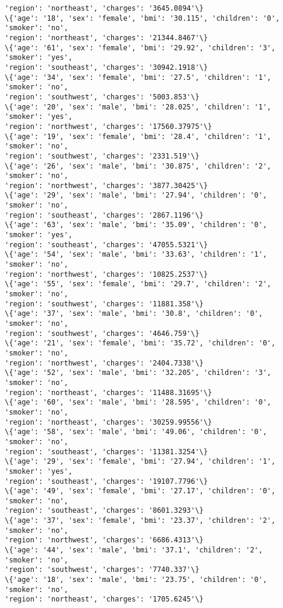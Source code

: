 \documentclass[11pt]{article}
\begin{document}
\begin{Verbatim}[commandchars=\\\{\}]
'region': 'northeast', 'charges': '3645.0894'\}
\{'age': '18', 'sex': 'female', 'bmi': '30.115', 'children': '0', 'smoker': 'no',
'region': 'northeast', 'charges': '21344.8467'\}
\{'age': '61', 'sex': 'female', 'bmi': '29.92', 'children': '3', 'smoker': 'yes',
'region': 'southeast', 'charges': '30942.1918'\}
\{'age': '34', 'sex': 'female', 'bmi': '27.5', 'children': '1', 'smoker': 'no',
'region': 'southwest', 'charges': '5003.853'\}
\{'age': '20', 'sex': 'male', 'bmi': '28.025', 'children': '1', 'smoker': 'yes',
'region': 'northwest', 'charges': '17560.37975'\}
\{'age': '19', 'sex': 'female', 'bmi': '28.4', 'children': '1', 'smoker': 'no',
'region': 'southwest', 'charges': '2331.519'\}
\{'age': '26', 'sex': 'male', 'bmi': '30.875', 'children': '2', 'smoker': 'no',
'region': 'northwest', 'charges': '3877.30425'\}
\{'age': '29', 'sex': 'male', 'bmi': '27.94', 'children': '0', 'smoker': 'no',
'region': 'southeast', 'charges': '2867.1196'\}
\{'age': '63', 'sex': 'male', 'bmi': '35.09', 'children': '0', 'smoker': 'yes',
'region': 'southeast', 'charges': '47055.5321'\}
\{'age': '54', 'sex': 'male', 'bmi': '33.63', 'children': '1', 'smoker': 'no',
'region': 'northwest', 'charges': '10825.2537'\}
\{'age': '55', 'sex': 'female', 'bmi': '29.7', 'children': '2', 'smoker': 'no',
'region': 'southwest', 'charges': '11881.358'\}
\{'age': '37', 'sex': 'male', 'bmi': '30.8', 'children': '0', 'smoker': 'no',
'region': 'southwest', 'charges': '4646.759'\}
\{'age': '21', 'sex': 'female', 'bmi': '35.72', 'children': '0', 'smoker': 'no',
'region': 'northwest', 'charges': '2404.7338'\}
\{'age': '52', 'sex': 'male', 'bmi': '32.205', 'children': '3', 'smoker': 'no',
'region': 'northeast', 'charges': '11488.31695'\}
\{'age': '60', 'sex': 'male', 'bmi': '28.595', 'children': '0', 'smoker': 'no',
'region': 'northeast', 'charges': '30259.99556'\}
\{'age': '58', 'sex': 'male', 'bmi': '49.06', 'children': '0', 'smoker': 'no',
'region': 'southeast', 'charges': '11381.3254'\}
\{'age': '29', 'sex': 'female', 'bmi': '27.94', 'children': '1', 'smoker': 'yes',
'region': 'southeast', 'charges': '19107.7796'\}
\{'age': '49', 'sex': 'female', 'bmi': '27.17', 'children': '0', 'smoker': 'no',
'region': 'southeast', 'charges': '8601.3293'\}
\{'age': '37', 'sex': 'female', 'bmi': '23.37', 'children': '2', 'smoker': 'no',
'region': 'northwest', 'charges': '6686.4313'\}
\{'age': '44', 'sex': 'male', 'bmi': '37.1', 'children': '2', 'smoker': 'no',
'region': 'southwest', 'charges': '7740.337'\}
\{'age': '18', 'sex': 'male', 'bmi': '23.75', 'children': '0', 'smoker': 'no',
'region': 'northeast', 'charges': '1705.6245'\}

\end{Verbatim}
\end{document}
